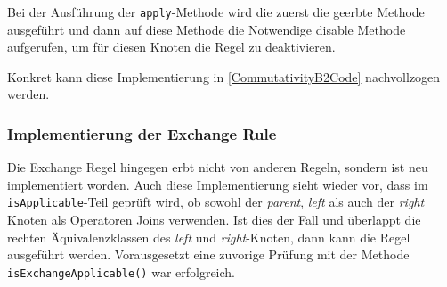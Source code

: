 Bei der Ausführung der \texttt{apply}-Methode wird die zuerst die geerbte Methode ausgeführt und dann auf diese Methode die Notwendige disable Methode aufgerufen, um für diesen Knoten die Regel zu deaktivieren.

Konkret kann diese Implementierung in \ref{CommutativityB2Code} nachvollzogen werden.




\subsubsection{Implementierung der Exchange Rule}
Die Exchange Regel hingegen erbt nicht von anderen Regeln, sondern ist neu implementiert worden. Auch diese Implementierung sieht wieder vor, dass im \texttt{is\-Applicable}-Teil geprüft wird, ob sowohl der \textit{parent}, \textit{left} als auch der \textit{right} Knoten als Operatoren Joins verwenden. Ist dies der Fall und überlappt die rechten Äquivalenzklassen des \textit{left} und \textit{right}-Knoten, dann kann die Regel ausgeführt werden. Vorausgesetzt eine zuvorige Prüfung mit der Methode \texttt{is\-Exchange\-Applicable()} war erfolgreich. 